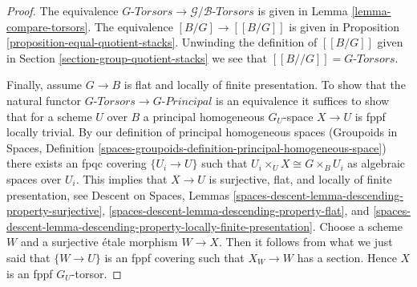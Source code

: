 \documentclass[10pt,a4paper]{amsart}
\theoremstyle{plain}
\theoremstyle{definition}
\theoremstyle{remark}
\numberwithin{equation}{subsection}
\begin{document}
\begin{proof}
The equivalence
$G\textit{-Torsors} \to \mathcal{G}/\mathcal{B}\textit{-Torsors}$
is given in Lemma \ref{lemma-compare-torsors}.
The equivalence $[B/G] \to [[B/G]]$ is given in
Proposition \ref{proposition-equal-quotient-stacks}.
Unwinding the definition of $[[B/G]]$ given in
Section \ref{section-group-quotient-stacks}
we see that $[[B//G]] = G\textit{-Torsors}$.

\medskip\noindent
Finally, assume $G \to B$ is flat and locally of finite presentation.
To show that the natural functor
$G\textit{-Torsors} \to G\textit{-Principal}$ is an equivalence
it suffices to show that for a scheme $U$ over $B$
a principal homogeneous $G_U$-space $X \to U$
is fppf locally trivial. By our definition of principal homogeneous spaces
(Groupoids in Spaces,
Definition \ref{spaces-groupoids-definition-principal-homogeneous-space})
there exists an fpqc covering $\{U_i \to U\}$ such that
$U_i \times_U X \cong G \times_B U_i$ as algebraic spaces over $U_i$.
This implies that $X \to U$ is surjective, flat, and locally of finite
presentation, see
Descent on Spaces, Lemmas
\ref{spaces-descent-lemma-descending-property-surjective},
\ref{spaces-descent-lemma-descending-property-flat}, and
\ref{spaces-descent-lemma-descending-property-locally-finite-presentation}.
Choose a scheme $W$ and a surjective \'etale morphism $W \to X$.
Then it follows from what we just said that $\{W \to U\}$ is an fppf covering
such that $X_W \to W$ has a section. Hence $X$ is an fppf $G_U$-torsor.
\end{proof}
\end{document}
